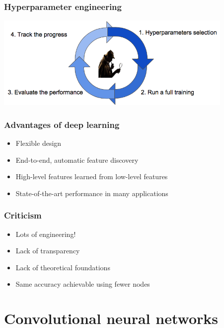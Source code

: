 \documentclass[10pt]{beamer}
\begin{document}
\begin{frame}
\frametitle{Hyperparameter engineering}
  \begin{center}
  \includegraphics[height=4.5cm]{images/hyperpars.png}
  \end{center}
\end{frame}

\begin{frame}
\frametitle{Advantages of deep learning}
\begin{itemize}
\item Flexible design
\item End-to-end, automatic feature discovery
\item High-level features learned from low-level features
\item State-of-the-art performance in many applications
\end{itemize}
\end{frame}

\begin{frame}
\frametitle{Criticism}
\begin{itemize}
\item Lots of engineering!
\item Lack of transparency
\item Lack of theoretical foundations
\item Same accuracy achievable using fewer nodes
\end{itemize}
\end{frame}

\section{Convolutional neural networks}
\end{document}
